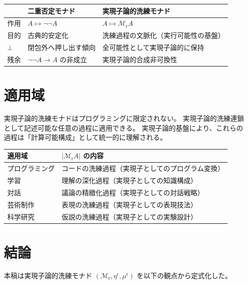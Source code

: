 \documentclass[11pt,a4paper]{article}
\theoremstyle{definition}
\newcommand{\Mr}{\mathcal{M}_{\mathrm{r}}}
\newcommand{\etar}{\eta^{\mathrm{r}}}
\newcommand{\mur}{\mu^{\mathrm{r}}}
\begin{document}
\begin{center}
\begin{tabular}{lll}
\hline
& \textbf{二重否定モナド} & \textbf{実現子論的洗練モナド} \\
\hline
作用 & $A\mapsto\neg\neg A$ & $A\mapsto\Mr A$ \\
目的 & 古典的安定化 & 洗練過程の文脈化（実行可能性の基盤） \\
$\bot$ & 閉包外へ押し出す傾向 & 全可能性として実現子論的に保持 \\
残余 & $\neg\neg A\to A$ の非成立 & 実現子論的合成非可換性 \\
\hline
\end{tabular}
\end{center}

\section{適用域}

実現子論的洗練モナドはプログラミングに限定されない。
実現子論的洗練連鎖として記述可能な任意の過程に適用できる。
実現子論的基盤により、これらの過程は「計算可能構成」として統一的に理解される。

\begin{center}
\begin{tabular}{ll}
\hline
\textbf{適用域} & \textbf{$|\Mr A|$ の内容} \\
\hline
プログラミング & コードの洗練過程（実現子としてのプログラム変換） \\
学習 & 理解の深化過程（実現子としての知識構成） \\
対話 & 議論の精緻化過程（実現子としての対話戦略） \\
芸術制作 & 表現の洗練過程（実現子としての表現技法） \\
科学研究 & 仮説の洗練過程（実現子としての実験設計） \\
\hline
\end{tabular}
\end{center}

\section{結論}

本稿は実現子論的洗練モナド $(\Mr,\etar,\mur)$ を以下の観点から定式化した。
\end{document}
